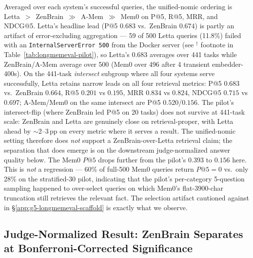 \documentclass{article}
\begin{document}
Averaged over each system's successful queries,
the unified-nomic ordering is
Letta~$>$~ZenBrain~$\gg$~A-Mem~$\gg$~Mem0
on P@5, R@5, MRR, and NDCG@5. Letta's headline lead (P@5 $0.683$ vs.\ ZenBrain $0.674$) is partly an artifact of error-excluding aggregation
--- 59 of 500 Letta queries (11.8\%) failed with an
\texttt{InternalServerError~500} from the Docker server (see
$^\dagger$ footnote in Table~\ref{tab:longmemeval-pilot}), so Letta's 0.683 averages over 441 tasks while
ZenBrain/A-Mem average over 500 (Mem0 over 496 after 4 transient
embedder-400s). On the 441-task \emph{intersect} subgroup where all
four systems serve successfully, Letta retains narrow leads
on all four retrieval metrics: P@5 $0.683$ vs.\ ZenBrain $0.664$,
R@5 $0.201$ vs $0.195$, MRR $0.834$ vs $0.824$, NDCG@5 $0.715$ vs
$0.697$; A-Mem/Mem0 on the same intersect are
P@5 $0.520$/$0.156$. The pilot's intersect-flip (where ZenBrain led
P@5 on 20 tasks) does not survive at 441-task scale: ZenBrain and
Letta are genuinely close on retrieval-proper, with Letta ahead by
$\sim$2--3\,pp on every metric where it serves a result. The
unified-nomic setting therefore does \emph{not} support a
ZenBrain-over-Letta retrieval claim; the separation that does
emerge is on the downstream judge-normalized answer quality below.
The Mem0 $P@5$ drops further from the pilot's $0.393$ to
$0.156$ here. This is \emph{not} a regression --- 60\% of
full-500 Mem0 queries return $P@5{=}0$ vs.\ only 28\% on the
stratified-30 pilot, indicating that the pilot's per-category 5-question
sampling happened to over-select queries on which Mem0's flat-$3900$-char
truncation still retrieves the relevant fact. The selection artifact
cautioned against in \S\ref{app:g5-longmemeval-scaffold} is exactly
what we observe.

\subsection{Judge-Normalized Result: ZenBrain Separates at Bonferroni-Corrected Significance}
\label{app:longmemeval-judge}
\end{document}
